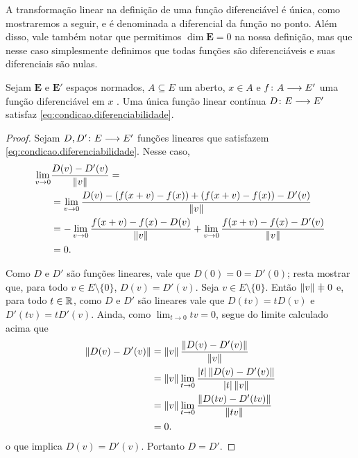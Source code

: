 A transformação linear na definição de uma função diferenciável é única, como mostraremos a seguir, e é denominada a diferencial da função no ponto. Além disso, vale também notar que permitimos $\dim \bm E = 0$ na nossa definição, mas que nesse caso simplesmente definimos que todas funções são diferenciáveis e suas diferenciais são nulas.

\begin{proposition}
Sejam $\bm E$ e $\bm E'$ espaços normados, $A \subseteq E$ um aberto, $x \in A$ e ${f}\colon {A} \longrightarrow {E'}$ uma função diferenciável em $x$ . Uma única função linear contínua ${D}\colon {E} \longrightarrow {E'}$ satisfaz \ref{eq:condicao.diferenciabilidade}.
\end{proposition}
\begin{proof}
Sejam ${D,D'}\colon {E} \longrightarrow {E'}$ funções lineares que satisfazem \ref{eq:condicao.diferenciabilidade}. Nesse caso,
	\begin{align*}
	\lim_{v \to 0} &\frac{D(v) - D'(v)}{\left\Vert{v}\right\Vert} = \\
	&= \lim_{v \to 0} \frac{D(v) - (f(x+v)-f(x)) + (f(x+v)-f(x)) - D'(v)}{\left\Vert{v}\right\Vert} \\
	&= -\lim_{v \to 0} \frac{f(x+v)-f(x) - D(v)}{\left\Vert{v}\right\Vert} + \lim_{v \to 0} \frac{f(x+v)-f(x) - D'(v)}{\left\Vert{v}\right\Vert} \\
	&= 0.
	\end{align*}

Como $D$ e $D'$ são funções lineares, vale que $D(0) = 0 = D'(0)$; resta mostrar que, para todo $v \in E \setminus \{0\}$, $D(v) = D'(v)$. Seja $v \in E \setminus \{0\}$. Então $\nor{v} \neq 0$ e, para todo $t \in \mathbb{R}$, como $D$ e $D'$ são lineares vale que $D(tv) = tD(v)$ e $D'(tv) = tD'(v)$. Ainda, como $\lim_{t \to 0} tv = 0$, segue do limite calculado acima que
	\begin{align*}
	\left\Vert{D(v) - D'(v)}\right\Vert &= \left\Vert{v}\right\Vert \frac{\left\Vert{D(v) - D'(v)}\right\Vert}{\left\Vert{v}\right\Vert} \\
		&= \left\Vert{v}\right\Vert \lim_{t \to 0} \frac{\left\vert{t}\right\vert\left\Vert{D(v) - D'(v)}\right\Vert}{\left\vert{t}\right\vert \left\Vert{v}\right\Vert} \\
		&= \left\Vert{v}\right\Vert \lim_{t \to 0} \frac{\left\Vert{D(tv) - D'(tv)}\right\Vert}{\left\Vert{tv}\right\Vert} \\
		&= 0.
	\end{align*}
o que implica $D(v) = D'(v)$. Portanto $D=D'$.
\end{proof}

